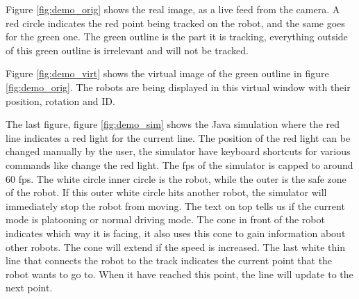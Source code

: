 \begin{figure}
    
            \caption[Demo of project]{}
            \label{fig:demo}
\end{figure}
Figure \ref{fig:demo_orig} shows the real image, as a live feed from the camera. A red circle indicates the red point being tracked on the robot, and the same goes for the green one. The green outline is the part it is tracking, everything outside of this green outline is irrelevant and will not be tracked.

Figure \ref{fig:demo_virt} shows the virtual image of the green outline in figure \ref{fig:demo_orig}. The robots are being displayed in this virtual window with their position, rotation and ID.

The last figure, figure \ref{fig:demo_sim} shows the Java simulation where the red line indicates a red light for the current line. The position of the red light can be changed manually by the user, the simulator have keyboard shortcuts for various commands like change the red light. The fps of the simulator is capped to around 60 fps. The white circle inner circle is the robot, while the outer is the safe zone of the robot. If this outer white circle hits another robot, the simulator will immediately stop the robot from moving. The text on top tells us if the current mode is platooning or normal driving mode. The cone in front of the robot indicates which way it is facing, it also uses this cone to gain information about other robots. The cone will extend if the speed is increased. The last white thin line that connects the robot to the track indicates the current point that the robot wants to go to. When it have reached this point, the line will update to the next point.


